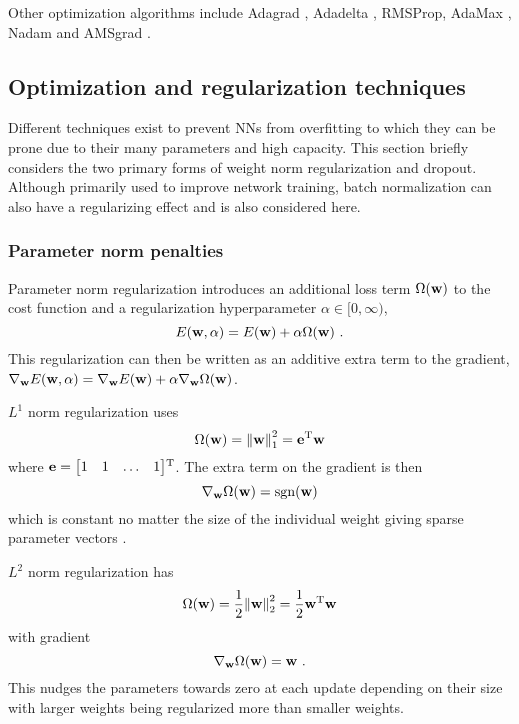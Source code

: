 Other optimization algorithms include Adagrad \cite{Duchi2011}, Adadelta \cite{Zeiler2012}, RMSProp, AdaMax \cite{Kingma2014}, Nadam \cite{Dozat2016} and AMSgrad \cite{Reddi2018}.


\subsection{Optimization and regularization techniques}
Different techniques exist to prevent \glspl{NN} from overfitting to which they can be prone due to their many parameters and high capacity. This section briefly considers the two primary forms of weight norm regularization and dropout. Although primarily used to improve network training, batch normalization can also have a regularizing effect and is also considered here.

\subsubsection{Parameter norm penalties}
Parameter norm regularization introduces an additional loss term $\Omega({\mathbf{w}})$ to the cost function and a regularization hyperparameter $\alpha\in[0,\infty)$,
\begin{equation}
    E(\w,\alpha) = E(\w) + \alpha\Omega(\w) \ .
\end{equation}
This regularization can then be written as an additive extra term to the gradient, $\nabla_{\mathbf{w}} E({\mathbf{w}},\alpha) = \nabla_{\mathbf{w}} E({\mathbf{w}}) + \alpha\nabla_{\mathbf{w}}\Omega({\mathbf{w}})$.

$L^1$ norm regularization uses
\begin{equation}
    \Omega({\mathbf{w}}) = {\left\lVert{\mathbf{w}}\right\rVert}_1^2 = {\mathbf{e}}{^\mathrm{T}}{\mathbf{w}}
\end{equation}
where ${\mathbf{e}}={\begin{bmatrix}1 & 1 & \dots & 1\end{bmatrix}}{^\mathrm{T}}$. The extra term on the gradient is then
\begin{equation}
    \nabla_{\mathbf{w}}\Omega({\mathbf{w}}) = \text{sgn}{\left({\mathbf{w}}\right)}
\end{equation}
which is constant no matter the size of the individual weight giving sparse parameter vectors \cite{Goodfellow2016}.

$L^2$ norm regularization has
\begin{equation}
        \Omega({\mathbf{w}}) = \frac{1}{2}{\left\lVert{\mathbf{w}}\right\rVert}_2^2 = \frac{1}{2}{\mathbf{w}}{^\mathrm{T}}{\mathbf{w}}
\end{equation}
with gradient
\begin{equation}\label{eq: Neural networks: L2 norm regularization gradient term}
    \nabla_{\mathbf{w}} \Omega({\mathbf{w}}) = {\mathbf{w}} \ .
\end{equation}
This nudges the parameters towards zero at each update depending on their size with larger weights being regularized more than smaller weights.

